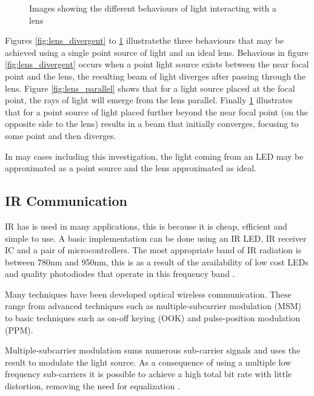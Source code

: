 \begin{figure}[H]
\begin{minipage}{.3\textwidth}
		\label{fig:lens_convergent}
	\end{minipage}
	\caption*{Images showing the different behaviours of light interacting with a lens}
\end{figure}

Figures \ref{fig:lens_divergent} to \ref{fig:lens_convergent} illustrate\footnotemark the three behaviours that may be achieved using a single point source of light and an ideal lens. Behavious in figure \ref{fig:lens_divergent} occurs when a point light source exists between the near focal point and the lens, the resulting beam of light diverges after passing through the lens. Figure \ref{fig:lens_parallel} shows that for a light source placed at the focal point, the rays of light will emerge from the lens parallel. Finally \ref{fig:lens_convergent} illustrates that for a point source of light placed further beyond the near focal point (on the opposite side to the lens) results in a beam that initially converges, focusing to some point and then diverges.

In may cases including this investigation, the light coming from an LED may be approximated as a point source and the lens approximated as ideal.


\subsection{IR Communication}

IR has is used in many applications, this is because it is cheap, efficient and simple to use. A basic implementation can be done using an IR LED, IR receiver IC and a pair of microcontrollers. The most appropriate band of IR radiation is between 780nm and 950nm, this is as a result of the availability of low cost LEDs and quality photodiodes that operate in this frequency band \cite{Elgala2011}.

Many techniques have been developed optical wireless communication. These range from advanced techniques such as multiple-subcarrier modulation (MSM) to basic techniques such as on-off keying (OOK) and pulse-position modulation (PPM).

Multiple-subcarrier modulation sums numerous sub-carrier signals and uses the result to modulate the light source. As a consequence of using a multiple low frequency sub-carriers it is possible to achieve a high total bit rate with little distortion, removing the need for equalization \cite{Ohtsuki2003}.

